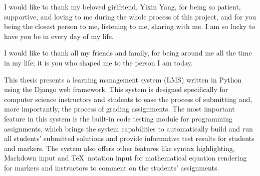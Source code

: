 \medskip

I would like to thank my beloved girlfriend, Yixin Yang,
for being so patient, supportive, and loving to me during the whole process
of this project, 
and for you being the closest person to me, listening to me, sharing with me.
I am so lucky to have you be in every day of my life.

\medskip

I would like to thank all my friends and family, for being around me all
the time in my life; it is you who shaped me to the person
I am today.



\tocAndSuch



This thesis presents a learning management system (LMS) written in Python using
the Django web framework. This system is designed specifically for computer
science instructors and students to ease the process of submitting and,
more importantly, the process of grading assignments. 
The most important feature in this system is the built-in code
testing module for programming assignments, which brings the system capabilities
to automatically build and run all students'
submitted solutions and provide informative test results for students and
markers.
The system also offers other features like syntax highlighting, Markdown input
and \TeX\ notation input for mathematical equation rendering for
markers and instructors to comment on the students' assignments.



\afterpreface
